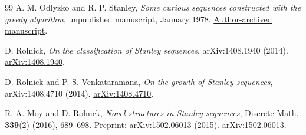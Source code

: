 \documentclass[11pt]{article}
\theoremstyle{definition}\newtheorem{definition}[theorem]{Definition}
\theoremstyle{remark}\newtheorem{remark}[theorem]{Remark}
\numberwithin{equation}{section}
\begin{document}
\begin{thebibliography}{99}
A. M. Odlyzko and R. P. Stanley,
\emph{Some curious sequences constructed with the greedy algorithm},
unpublished manuscript, January 1978.
\href{https://www.dtc.umn.edu/~odlyzko/unpublished/greedy.sequence.pdf}{Author-archived manuscript}.

D. Rolnick, \emph{On the classification of Stanley sequences},
arXiv:1408.1940 (2014).
\href{https://arxiv.org/abs/1408.1940}{arXiv:1408.1940}.

D. Rolnick and P. S. Venkataramana,
\emph{On the growth of Stanley sequences},
arXiv:1408.4710 (2014).
\href{https://arxiv.org/abs/1408.4710}{arXiv:1408.4710}.

R. A. Moy and D. Rolnick, \emph{Novel structures in Stanley sequences},
Discrete Math. \textbf{339}(2) (2016), 689--698. Preprint: arXiv:1502.06013 (2015).
\href{https://arxiv.org/abs/1502.06013}{arXiv:1502.06013}.
\end{thebibliography}
\end{document}
